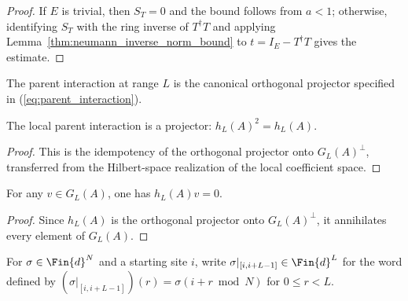\begin{proof}
    \leanok
    If $E$ is trivial, then $S_T=0$ and the bound follows from $a<1$;
    otherwise, identifying $S_T$ with the ring inverse of $T^\dagger T$ and
    applying Lemma~\ref{thm:neumann_inverse_norm_bound} to
    $t=I_E-T^\dagger T$ gives the estimate.
\end{proof}

\begin{definition}\label{def:parent_interaction}
    \leanok
    The parent interaction at range $L$ is the canonical orthogonal projector
    specified in (\ref{eq:parent_interaction}).
\end{definition}

\begin{lemma}
    \label{lem:parent_interaction_idempotent}
    \leanok
    The local parent interaction is a projector:
    $h_L(A)^2=h_L(A)$.
\end{lemma}

\begin{proof}
    \leanok
    This is the idempotency of the orthogonal projector onto $G_L(A)^\perp$,
    transferred from the Hilbert-space realization of the local coefficient
    space.
\end{proof}

\begin{lemma}%
    \label{lem:parent_interaction_apply_mem_ground_space}
    \leanok
    For any $v\in G_L(A)$, one has $h_L(A)v=0$.
\end{lemma}

\begin{proof}
    \leanok
    Since $h_L(A)$ is the orthogonal projector onto $G_L(A)^\perp$, it
    annihilates every element of $G_L(A)$.
\end{proof}

\begin{definition}\label{def:extract_window}
    \leanok
    For $\sigma\in\Fin{d}^{N}$ and a starting site $i$, write
    $\sigma|_{[i,i+L-1]}\in\Fin{d}^{L}$ for the word defined by
    $(\sigma|_{[i,i+L-1]})(r)=\sigma(i+r\bmod N)$ for $0\le r<L$.
\end{definition}

